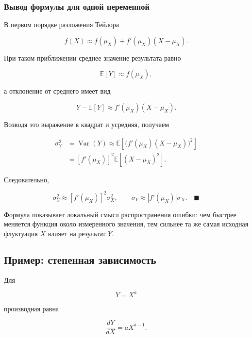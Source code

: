 \documentclass[
  russian,
  12pt,
  a4paper,
  a4paper,
  openany]{scrbook}
\begin{document}
\begin{bookderivation}

\subsubsection{Вывод формулы для одной
переменной}\label{ux432ux44bux432ux43eux434-ux444ux43eux440ux43cux443ux43bux44b-ux434ux43bux44f-ux43eux434ux43dux43eux439-ux43fux435ux440ux435ux43cux435ux43dux43dux43eux439}

В первом порядке разложения Тейлора

\[
f(X)\approx f(\mu_X)+f'(\mu_X)(X-\mu_X).
\]

При таком приближении среднее значение результата равно

\[
\mathbb E[Y]\approx f(\mu_X),
\]

а отклонение от среднего имеет вид

\[
Y-\mathbb E[Y]
\approx
f'(\mu_X)(X-\mu_X).
\]

Возводя это выражение в квадрат и усредняя, получаем

\[
\begin{aligned}
\sigma_Y^2
&=\operatorname{Var}(Y)
\approx
\mathbb E\!\left[
\bigl(f'(\mu_X)(X-\mu_X)\bigr)^2
\right]\\
&=
\left[f'(\mu_X)\right]^2
\mathbb E[(X-\mu_X)^2].
\end{aligned}
\]

Следовательно,

\[
\boxed{
\sigma_Y^2
\approx
\left[f'(\mu_X)\right]^2\sigma_X^2,
\qquad
\sigma_Y
\approx
\left|f'(\mu_X)\right|\sigma_X.
}
\quad\blacksquare
\]

\end{bookderivation}

Формула показывает локальный смысл распространения ошибки: чем быстрее
меняется функция около измеренного значения, тем сильнее та же самая
исходная флуктуация \(X\) влияет на результат \(Y\).

\subsection{Пример: степенная
зависимость}\label{ux43fux440ux438ux43cux435ux440-ux441ux442ux435ux43fux435ux43dux43dux430ux44f-ux437ux430ux432ux438ux441ux438ux43cux43eux441ux442ux44c}

Для

\[Y=X^a\]

производная равна

\[
\frac{dY}{dX}=aX^{a-1}.
\]
\end{document}
